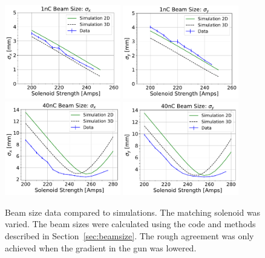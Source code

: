 \begin{figure}
	\includegraphics[width=0.45\textwidth]{images/xbeamsizes_low_charge_sol_scan_11-02-2017}%
	\includegraphics[width=0.45\textwidth]{images/ybeamsizes_low_charge_sol_scan_11-02-2017}\\
	
	
	\includegraphics[width=0.45\textwidth]{images/xbeamsizes_high_charge_sol_scan_10-17-2017}%
	\includegraphics[width=0.45\textwidth]{images/ybeamsizes_high_charge_sol_scan_10-17-2017}
	\caption{Beam size data compared to simulations. The matching solenoid was varied. 
	The beam sizes were calculated using the code and methods described in Section~\ref{sec:beamsize}. 
	The rough agreement was only achieved when the gradient in the gun was lowered.}
\label{fig:solscan}
\end{figure}


